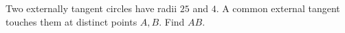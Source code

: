Two externally tangent circles have radii $25$ and $4$. A common external tangent touches them at distinct points $A,B$. Find $AB$.

